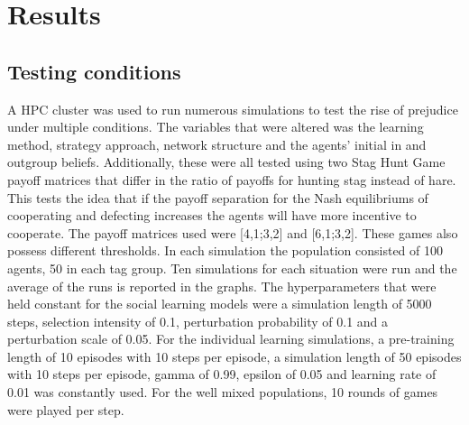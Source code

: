 \documentclass[]{llncs}
\begin{document}
\section{Results}

\subsection{Testing conditions}
A HPC cluster was used to run numerous simulations to test the rise of prejudice under multiple conditions. The variables that were altered was the learning method, strategy approach, network structure and the agents’ initial in and outgroup beliefs. Additionally, these were all tested using two Stag Hunt Game payoff matrices that differ in the ratio of payoffs for hunting stag instead of hare. This tests the idea that if the payoff separation for the Nash equilibriums of cooperating and defecting increases the agents will have more incentive to cooperate. The payoff matrices used were [4,1;3,2] and [6,1;3,2]. These games also possess different thresholds. 
In each simulation the population consisted of 100 agents, 50 in each tag group. Ten simulations for each situation were run and the average of the runs is reported in the graphs. The hyperparameters that were held constant for the social learning models were a simulation length of 5000 steps, selection intensity of 0.1, perturbation probability of 0.1 and a perturbation scale of 0.05. For the individual learning simulations, a pre-training length of 10 episodes with 10 steps per episode, a simulation length of 50 episodes with 10 steps per episode, gamma of 0.99, epsilon of 0.05 and learning rate of 0.01 was constantly used. For the well mixed populations, 10 rounds of games were played per step. 
\end{document}

